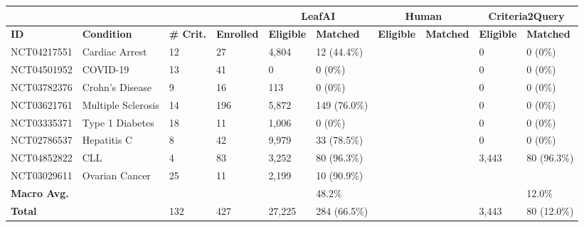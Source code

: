 \def\arraystretch{1.4}
\begin{tabular}{m{1.7cm} m{2.3cm} m{0.9cm} m{1cm} |m{0.8cm} m{1.7cm} |m{0.8cm} m{1.7cm} |m{0.8cm} m{1.7cm}}
     & & & & \multicolumn{2}{c}{\textbf{LeafAI}} & \multicolumn{2}{|c|}{\textbf{Human}} & \multicolumn{2}{c}{\textbf{Criteria2Query}}  \\
     \toprule
    \textbf{ID} & \textbf{Condition} & \textbf{\# Crit.} & \textbf{Enrolled} & \textbf{Eligible} & \textbf{Matched} & \textbf{Eligible} & \textbf{Matched} & \textbf{Eligible} & \textbf{Matched} \\
    \midrule
    NCT04217551 & Cardiac Arrest & 12 & 27 & 4,804 & 12 (44.4\%) & & & 0 & 0 (0\%) \\
    NCT04501952 & COVID-19 & 13 & 41 & 0 & 0 (0\%) & & & 0 & 0 (0\%) \\
    NCT03782376 & Crohn's Disease & 9 & 16 & 113 & 0 (0\%) & & & 0 & 0 (0\%) \\
    NCT03621761 & Multiple Sclerosis & 14 & 196 & 5,872 & 149 (76.0\%) & & & 0 & 0 (0\%) \\
    NCT03335371 & Type 1 Diabetes & 18 & 11 & 1,006 & 0 (0\%) & & & 0 & 0 (0\%)  \\
    NCT02786537 & Hepatitis C & 8 & 42 & 9,979 & 33 (78.5\%) & & & 0 & 0 (0\%) \\
    NCT04852822 & CLL & 4 & 83 & 3,252 & 80 (96.3\%) & & & 3,443 & 80 (96.3\%) \\
    NCT03029611 & Ovarian Cancer & 25 & 11 & 2,199 & 10 (90.9\%) & & &  &  \\
    \bottomrule
    \textbf{Macro Avg.} & & & & & 48.2\% & & & & 12.0\% \\
    \textbf{Total} & & 132 & 427 & 27,225 & 284 (66.5\%) & & & 3,443 & 80 (12.0\%) \\
\end{tabular}